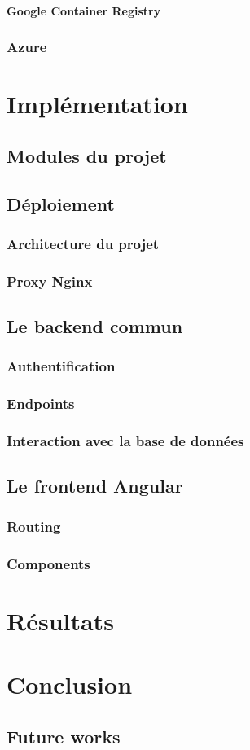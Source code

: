\documentclass[11pt,a4paper]{report}
\begin{document}
\subsubsection{Google Container Registry}
\subsection{Azure}

\chapter{Implémentation}
\section{Modules du projet}
\section{Déploiement}
\subsection{Architecture du projet}
\subsection{Proxy Nginx}
\section{Le backend commun}
\subsection{Authentification}
\subsection{Endpoints}
\subsection{Interaction avec la base de données}
\section{Le frontend Angular}
\subsection{Routing}
\subsection{Components}
\chapter{Résultats}
\chapter{Conclusion}
\section{Future works}


\end{document}
